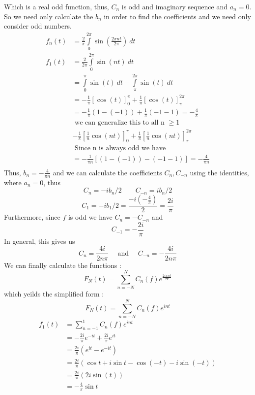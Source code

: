 Which is a real odd function, thus, $ C_n $ is odd and imaginary sequence and $ a_n = 0 $. 
So we need only calculate the $ b_n $ in order to find the coefficients and we need only
consider odd numbers.  
\begin{align*}
    f_n(t) &= \frac{ 2 }{ \pi  } \int\limits_{0}^{2\pi} \sin \left( \frac{ 2\pi nt }{ 2\pi
    } \right) \ dt \\   
    f_1(t) &=  \frac{ 2 }{ 2\pi  } \int\limits_{0}^{2\pi} \sin \left( nt \right) \ dt \\ 
           &= \int\limits_{0}^{\pi } \sin(t)\ dt - \int\limits_{\pi}^{2\pi} \sin(t) \ dt \\ 
    &= -\frac{ 1 }{ \pi } \left[ \cos(t) \right] _{ 0 }^{ \pi } + \frac{ 1 }{ \pi }
     \left[ \cos(t)\right] _{ \pi }^{ 2\pi } \\
      &= -\frac{ 1 }{ \pi  } \left( 1 - \left( -1\right) \right) + \frac{ 1 }{ \pi }
      \left( -1 - 1 \right) = - \frac{ 4 }{ \pi  }  \\ 
     &\text{ we can generalize this to all n } \geq 1  \\ 
    & -\frac{ 1 }{ \pi } \left[ \frac{ 1 }{ n }  \cos(nt) \right] _{ 0 }^{ \pi } + \frac{ 1 }{ \pi }
     \left[ \frac{ 1 }{ n }  \cos(nt)\right] _{ \pi }^{ 2\pi } \\
      &\text{ Since n is always odd we have }  \\
      &= - \frac{ 1 }{ \pi n  } \left[ \left( 1 - \left( -1\right) \right) - \left( -1 - 1
      \right) \right]  = -\frac{ 4 }{ \pi n }   \\ 
\end{align*}
Thus, $ b_n = - \frac{ 4 }{ \pi n }  $ and we can calculate the coefficients $ C_n, C_{-n}
$ using the identities, where $ a_n = 0 $, thus  
\[
    C_n = -ib_n / 2 \qquad C_{-n} = ib_n / 2
\]
\[
    C_1 = -ib_1 / 2 = \frac{ -i\left( -\frac{ 4 }{ \pi }  \right)  }{ 2 } =
    \frac{ 2i}{\pi}  
\]
Furthermore, since $ f $ is odd we have $ C_n = - C_{-n}  $ and 
\[
    C_{-1} = - \frac{ 2i }{ \pi  } 
\]
In general, this gives us 
\[
    C_n = \frac{ 4i }{ 2n\pi } \quad \text{ and } \quad C_{-n} = -\frac{ 4i }{ 2n\pi }  
\]
We can finally calculate the functions : 
\[
    F_N(t) = \sum_{n = -N}^{N} C_n(f)e _{  }^{ \frac{ 2i\pi nt  }{ 2\pi }  } 
\]
which yeilds the simplified form : 
\[
    F_N(t) = \sum_{n=-N}^{N} C_n\left( f\right) e _{  }^{ int } 
\]
\begin{align*}
    f_1(t)  &= \sum_{n=-1}^{1} C_n \left( f\right) e _{  }^{ int  }  \\ 
            &= - \frac{ 2i }{ \pi } e _{  }^{ -it } + \frac{ 2i }{ \pi  } e _{  }^{ it }    \\
             &= \frac{ 2i }{ \pi } \left( e _{  }^{ it } - e _{  }^{ -it } \right)  \\ 
             &= \frac{ 2i }{ \pi  } \left( \cos t + i\sin t - \cos(-t) -i\sin(-t)\right)  \\
             &= \frac{ 2i }{ \pi  }\left( 2i\sin(t) \right)  \\
              &= -\frac{4  }{ \pi  } \sin t \\ 
\end{align*}
